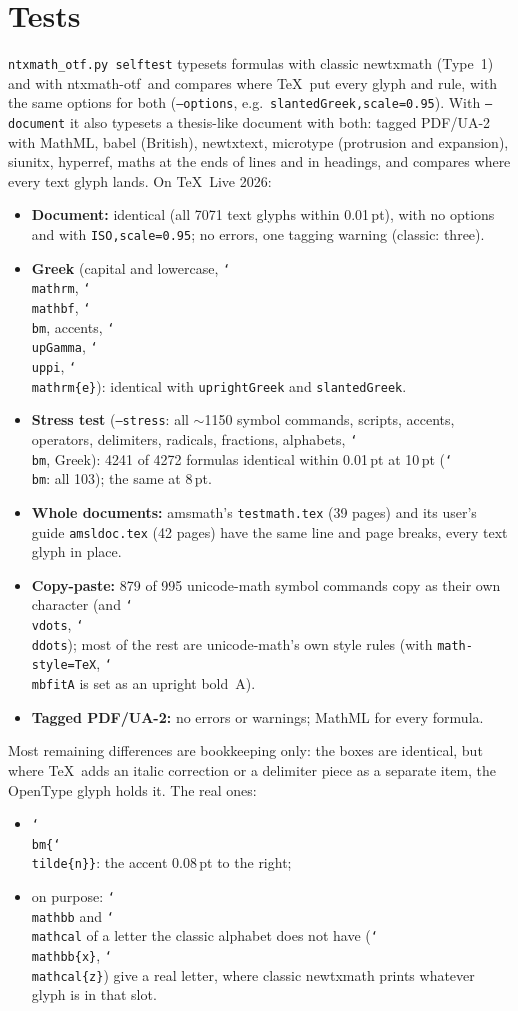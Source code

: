 \documentclass[11pt,a4paper]{article}
\newcommand\pkg{\textsf{ntxmath-otf}}
\newcommand\cs[1]{\texttt{\char`\\#1}}
\begin{document}
\section{Tests}
\texttt{ntxmath\_otf.py selftest} typesets formulas with classic \textsf{newtxmath} (Type~1)
and with \pkg\ and compares where \TeX\ put every glyph and rule, with the same options for
both (\texttt{--options}, e.g.\ \texttt{slantedGreek,scale=0.95}). With
\texttt{--document} it also typesets a thesis-like document with both: tagged PDF/UA-2 with
MathML, \textsf{babel} (British), \textsf{newtxtext}, \textsf{microtype} (protrusion and
expansion), \textsf{siunitx}, \textsf{hyperref}, maths at the ends of lines and in headings,
and compares where every text glyph lands. On \TeX\ Live 2026:
\begin{itemize}
\item \textbf{Document:} identical (all 7071 text glyphs within 0.01\,pt), with no options
  and with \texttt{ISO,scale=0.95}; no errors, one tagging warning (classic: three).
\item \textbf{Greek} (capital and lowercase, \cs{mathrm}, \cs{mathbf}, \cs{bm}, accents,
  \cs{upGamma}, \cs{uppi}, \cs{mathrm\{e\}}): identical with \texttt{uprightGreek} and
  \texttt{slantedGreek}.
\item \textbf{Stress test} (\texttt{--stress}: all $\sim$1150 symbol commands, scripts,
  accents, operators, delimiters, radicals, fractions, alphabets, \cs{bm}, Greek): 4241 of
  4272 formulas identical within 0.01\,pt at 10\,pt (\cs{bm}: all 103); the same at 8\,pt.
\item \textbf{Whole documents:} \textsf{amsmath}'s \texttt{testmath.tex} (39 pages) and its
  user's guide \texttt{amsldoc.tex} (42 pages) have the same line and page breaks, every text
  glyph in place.
\item \textbf{Copy-paste:} 879 of 995 \textsf{unicode-math} symbol commands copy as their
  own character (and \cs{vdots}, \cs{ddots}); most of the rest are \textsf{unicode-math}'s
  own style rules (with \texttt{math-style=TeX}, \cs{mbfitA} is set as an upright bold~A).
\item \textbf{Tagged PDF/UA-2:} no errors or warnings; MathML for every formula.
\end{itemize}
Most remaining differences are bookkeeping only: the boxes are identical, but where \TeX\
adds an italic correction or a delimiter piece as a separate item, the OpenType glyph holds
it. The real ones:
\begin{itemize}
\item \cs{bm\{\cs{tilde}\{n\}\}}: the accent 0.08\,pt to the right;
\item on purpose: \cs{mathbb} and \cs{mathcal} of a letter the classic alphabet does not
  have (\cs{mathbb\{x\}}, \cs{mathcal\{z\}}) give a real letter, where classic
  \textsf{newtxmath} prints whatever glyph is in that slot.
\end{itemize}
\end{document}

